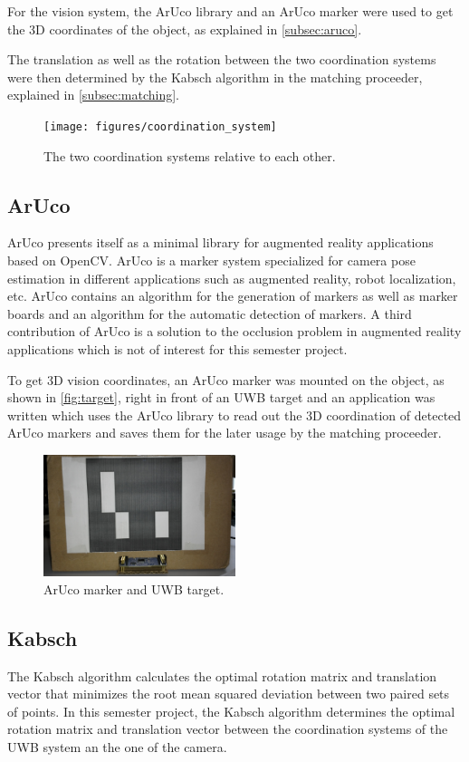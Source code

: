 For the vision system, the ArUco \cite{Aruco2014} library and an ArUco marker were used to get the 3D coordinates of the object, as explained in \autoref{subsec:aruco}.

The translation as well as the rotation between the two coordination systems were then determined by the Kabsch algorithm \cite{Kabsch:a12999} in the matching proceeder, explained in \autoref{subsec:matching}.
\begin{figure}[ht!]\centering
	\texttt{[image: figures/coordination\_system]}
	\caption{The two coordination systems relative to each other.}\label{fig:coordinationsystem}
\end{figure}

\subsection{ArUco}\label{subsec:aruco}
ArUco \cite{Aruco2014} presents itself as a minimal library for augmented reality applications based on OpenCV. ArUco is a marker system specialized for camera pose estimation in different applications such as augmented reality, robot localization, etc. ArUco contains an algorithm for the generation of markers as well as marker boards and an algorithm for the automatic detection of markers. A third contribution of ArUco is a solution to the occlusion problem in augmented reality applications which is not of interest for this semester project.

To get 3D vision coordinates, an ArUco marker was mounted on the object, as shown in \autoref{fig:target}, right in front of an UWB target and an application was written which uses the ArUco library to read out the 3D coordination of detected ArUco markers and saves them for the later usage by the matching proceeder.
\begin{figure}[ht!]\centering
	\includegraphics[width=0.5\textwidth]{figures/Box_cut.jpg}
	\caption{ArUco marker and UWB target.}\label{fig:target}
\end{figure}

\subsection{Kabsch}
The Kabsch algorithm \cite{Kabsch:a12999} calculates the optimal rotation matrix and translation vector that minimizes the root mean squared deviation between two paired sets of points. In this semester project, the Kabsch algorithm determines the optimal rotation matrix and translation vector between the coordination systems of the UWB system an the one of the camera.

